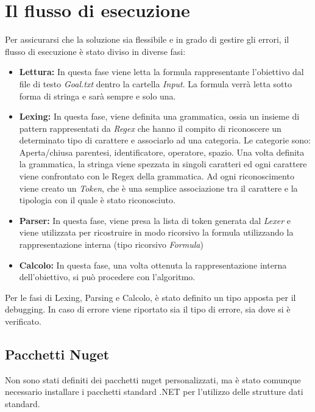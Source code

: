 \documentclass[\main/tesi.tex]{subfiles}
\begin{document}
\section{Il flusso di esecuzione}
Per assicurarsi che la soluzione sia flessibile e in grado di gestire gli errori, il flusso di esecuzione è stato diviso in diverse fasi:
\begin{itemize}
    \item \textbf{Lettura:} In questa fase viene letta la formula rappresentante l'obiettivo dal file di testo \textit{Goal.txt} dentro la cartella \textit{Input}. La formula verrà letta sotto forma di stringa e sarà sempre e solo una.
    \item \textbf{Lexing:} In questa fase, viene definita una grammatica, ossia un insieme di pattern rappresentati da \textit{Regex} che hanno il compito di riconoscere un determinato tipo di carattere e associarlo ad una categoria. Le categorie sono: Aperta/chiusa parentesi, identificatore, operatore, spazio. Una volta definita la grammatica, la stringa viene spezzata in singoli caratteri ed ogni carattere viene confrontato con le Regex della grammatica. Ad ogni riconoscimento viene creato un \textit{Token}, che è una semplice associazione tra il carattere e la tipologia con il quale è stato riconosciuto.
    \item \textbf{Parser:} In questa fase, viene presa la lista di token generata dal \textit{Lexer} e viene utilizzata per ricostruire in modo ricorsivo la formula utilizzando la rappresentazione interna (tipo ricorsivo \textit{Formula})
    \item \textbf{Calcolo:} In questa fase, una volta ottenuta la rappresentazione interna dell'obiettivo, si può procedere con l'algoritmo.
\end{itemize}
Per le fasi di Lexing, Parsing e Calcolo, è stato definito un tipo apposta per il debugging. In caso di errore viene riportato sia il tipo di errore, sia dove si è verificato.

\subsection{Pacchetti Nuget}
\label{nuget}
Non sono stati definiti dei pacchetti nuget \cite{nuget} personalizzati, ma è stato comunque necessario installare i pacchetti standard .NET \cite{dotnet} per l'utilizzo delle strutture dati standard.
\end{document}

